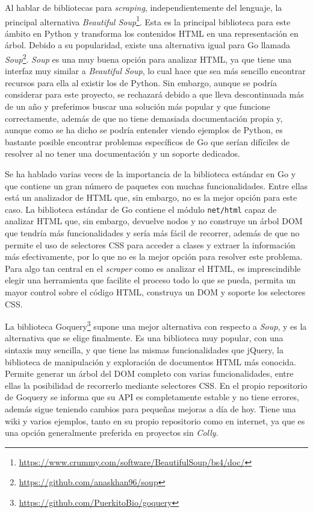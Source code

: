 Al hablar de bibliotecas para \textit{scraping}, independientemente del
lenguaje, la principal alternativa \textit{Beautiful
Soup}\footnote{\url{https://www.crummy.com/software/BeautifulSoup/bs4/doc/}}.
Esta es la principal biblioteca para este ámbito en Python y transforma los
contenidos HTML en una representación en árbol. Debido a su popularidad, existe
una alternativa igual para Go llamada
\textit{Soup}\footnote{\url{https://github.com/anaskhan96/soup}}. \textit{Soup}
es una muy buena opción para analizar HTML, ya que tiene una interfaz muy
similar a \textit{Beautiful Soup}, lo cual hace que sea más sencillo encontrar
recursos para ella al existir los de Python. Sin embargo, aunque se podría
considerar para este proyecto, se rechazará debido a que lleva descontinuada más
de un año y preferimos buscar una solución más popular y que funcione
correctamente, además de que no tiene demasiada documentación propia y, aunque
como se ha dicho se podría entender viendo ejemplos de Python, es bastante
posible encontrar problemas específicos de Go que serían difíciles de resolver
al no tener una documentación y un soporte dedicados.

Se ha hablado varias veces de la importancia de la biblioteca estándar en Go y
que contiene un gran número de paquetes con muchas funcionalidades. Entre ellas
está un analizador de HTML que, sin embargo, no es la mejor opción para este
caso. La biblioteca estándar de Go contiene el módulo \texttt{net/html} capaz de
analizar HTML que, sin embargo, devuelve nodos y no construye un árbol DOM que
tendría más funcionalidades y sería más fácil de recorrer, además de que no
permite el uso de selectores CSS para acceder a clases y extraer la información
más efectivamente, por lo que no es la mejor opción para resolver este problema.
Para algo tan central en el \textit{scraper} como es analizar el HTML, es
imprescindible elegir una herramienta que facilite el proceso todo lo que se
pueda, permita un mayor control sobre el código HTML, construya un DOM y soporte
los selectores CSS.

La biblioteca Goquery\footnote{\url{https://github.com/PuerkitoBio/goquery}}
supone una mejor alternativa con respecto a \textit{Soup}, y es la alternativa
que se elige finalmente. Es una biblioteca muy popular, con una sintaxis muy
sencilla, y que tiene las mismas funcionalidades que jQuery, la biblioteca de
manipulación y exploración de documentos HTML más conocida. Permite generar un
árbol del DOM completo con varias funcionalidades, entre ellas la posibilidad de
recorrerlo mediante selectores CSS. En el propio repositorio de Goquery se
informa que su API es completamente estable y no tiene errores, además sigue
teniendo cambios para pequeñas mejoras a día de hoy. Tiene una wiki y varios
ejemplos, tanto en su propio repositorio como en internet, ya que es una opción
generalmente preferida en proyectos sin \textit{Colly}.

